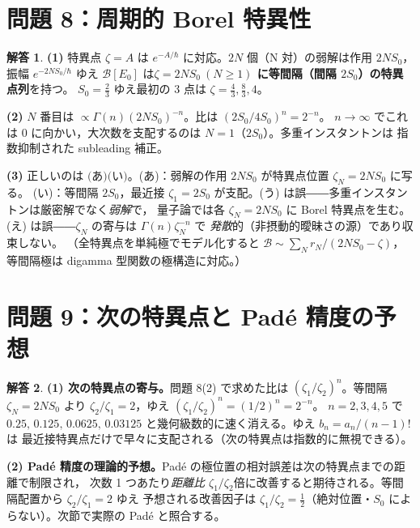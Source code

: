 \documentclass[dvipdfmx, uplatex]{jsarticle}
\newcommand{\hb}{\hbar}
\newcommand{\Bor}{\mathcal{B}}
\theoremstyle{definition}
\newtheorem*{sol}{解答}
\begin{document}
\section{問題 8：周期的 Borel 特異性}

\begin{sol}
\textbf{(1)} 特異点 $\zeta=A$ は $e^{-A/\hb}$ に対応。$2N$ 個（N 対）の弱解は作用 $2NS_0$，振幅 $e^{-2NS_0/\hb}$ ゆえ
$\Bor[E_0]$ は\textbf{$\boxed{\zeta=2NS_0\ (N\ge1)}$ に等間隔（間隔 $2S_0$）の特異点列}を持つ。
$S_0=\tfrac23$ ゆえ最初の 3 点は $\boxed{\zeta=\tfrac43,\tfrac83,4}$。

\textbf{(2)} $N$ 番目は $\propto\Gamma(n)(2NS_0)^{-n}$。比は $(2S_0/4S_0)^n=\boxed{2^{-n}}$。
$n\to\infty$ でこれは $\boxed{0}$ に向かい，大次数を支配するのは $\boxed{N=1}$（$2S_0$）。多重インスタントンは
指数抑制された subleading 補正。

\textbf{(3)} 正しいのは $\boxed{\text{(あ)(い)}}$。(あ)：弱解の作用 $2NS_0$ が特異点位置 $\zeta_N=2NS_0$ に写る。
(い)：等間隔 $2S_0$，最近接 $\zeta_1=2S_0$ が支配。(う) は誤――多重インスタントンは厳密解でなく\emph{弱解}で，
量子論では各 $\zeta_N=2NS_0$ に Borel 特異点を生む。(え) は誤――$\zeta_N$ の寄与は $\Gamma(n)\zeta_N^{-n}$ で
\emph{発散}的（非摂動的曖昧さの源）であり収束しない。
（全特異点を単純極でモデル化すると $\Bor\sim\sum_N r_N/(2NS_0-\zeta)$，等間隔極は digamma 型関数の極構造に対応。）
\end{sol}

\section{問題 9：次の特異点と Pad\'e 精度の予想}

\begin{sol}
\textbf{(1) 次の特異点の寄与。}問題 8(2) で求めた比は $(\zeta_1/\zeta_2)^n$。等間隔 $\zeta_N=2NS_0$ より
$\zeta_2/\zeta_1=2$，ゆえ $(\zeta_1/\zeta_2)^n=\boxed{(1/2)^n=2^{-n}}$。
$n=2,3,4,5$ で $\boxed{0.25,\,0.125,\,0.0625,\,0.03125}$ と幾何級数的に速く消える。ゆえ $b_n=a_n/(n-1)!$ は
最近接特異点だけで早々に支配される（次の特異点は指数的に無視できる）。

\textbf{(2) Pad\'e 精度の理論的予想。}Pad\'e の極位置の相対誤差は次の特異点までの距離で制限され，
次数 1 つあたり\emph{距離比 $\zeta_1/\zeta_2$}倍に改善すると期待される。等間隔配置から $\zeta_2/\zeta_1=2$ ゆえ
予想される改善因子は $\boxed{\zeta_1/\zeta_2=\tfrac12}$（絶対位置・$S_0$ によらない）。次節で実際の Pad\'e と照合する。
\end{sol}
\end{document}
